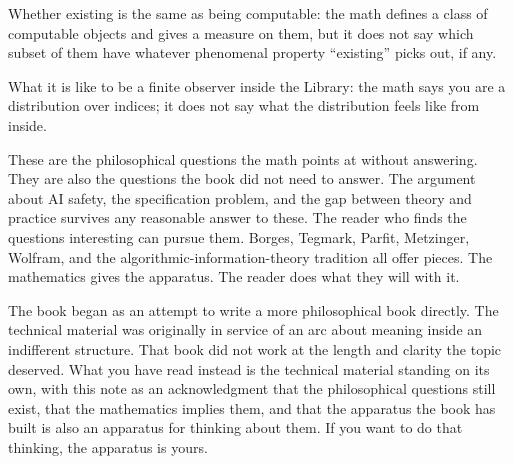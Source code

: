 Whether existing is the same as being computable: the math defines a class of computable objects and gives a measure on them, but it does not say which subset of them have whatever phenomenal property ``existing'' picks out, if any.

What it is like to be a finite observer inside the Library: the math says you are a distribution over indices; it does not say what the distribution feels like from inside.

These are the philosophical questions the math points at without answering. They are also the questions the book did not need to answer. The argument about AI safety, the specification problem, and the gap between theory and practice survives any reasonable answer to these. The reader who finds the questions interesting can pursue them. Borges, Tegmark, Parfit, Metzinger, Wolfram, and the algorithmic-information-theory tradition all offer pieces. The mathematics gives the apparatus. The reader does what they will with it.

\medskip

\noindent The book began as an attempt to write a more philosophical book directly. The technical material was originally in service of an arc about meaning inside an indifferent structure. That book did not work at the length and clarity the topic deserved. What you have read instead is the technical material standing on its own, with this note as an acknowledgment that the philosophical questions still exist, that the mathematics implies them, and that the apparatus the book has built is also an apparatus for thinking about them. If you want to do that thinking, the apparatus is yours.
